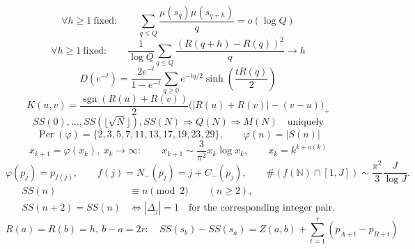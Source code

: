 \documentclass[11pt]{amsart}
\numberwithin{equation}{section}
\theoremstyle{plain}
\theoremstyle{definition}
\theoremstyle{remark}
\begin{document}
\begin{equation}
\label{eq:summary-sf-chowla}
\boxed{\;\forall h\ge1\ \text{fixed}:\qquad
\sum_{q\le Q}\frac{\mu(s_q)\mu(s_{q+h})}{q}=o(\log Q)\;}
\end{equation}
\begin{equation}
\label{eq:summary-window-variance}
\boxed{\;\forall h\ge1\ \text{fixed}:\qquad
\frac1{\log Q}\sum_{q\le Q}
\frac{(R(q+h)-R(q))^2}{q}\to h\;}
\end{equation}
\begin{equation}
\label{eq:summary-D-sinh}
\boxed{\;D(e^{-t})=
\frac{2e^{-t}}{1-e^{-t}}\sum_{q\ge0}e^{-tq/2}
\sinh\!\left(\frac{tR(q)}2\right)\;}
\end{equation}
\begin{equation}
\label{eq:summary-survival-kernel}
\boxed{\;K(u,v)=\frac{\operatorname{sgn}(R(u)+R(v))}{2}
\bigl(|R(u)+R(v)|-(v-u)\bigr)_+\;}
\end{equation}
\begin{equation}
\label{eq:summary-sqrt-recovery}
\boxed{\;SS(0),\ldots,SS(\lfloor\sqrt N\rfloor),SS(N)
\Longrightarrow Q(N)\Longrightarrow M(N)\quad\text{uniquely}\;}
\end{equation}
\begin{equation}
\label{eq:summary-phi-dynamics}
\boxed{\;\operatorname{Per}(\varphi)=\{2,3,5,7,11,13,17,19,23,29\},
\qquad \varphi(n)=|S(n)|\;}
\end{equation}
\begin{equation}
\label{eq:summary-phi-escape}
\boxed{\;x_{k+1}=\varphi(x_k),\ x_k\to\infty:
\qquad x_{k+1}\sim\frac{3}{\pi^2}x_k\log x_k,
\qquad x_k=k^{k+o(k)}\;}
\end{equation}
\begin{equation}
\label{eq:summary-prime-index-dynamics}
\boxed{\;\varphi(p_j)=p_{f(j)},\qquad
f(j)=N_-(p_j)=j+C_-(p_j),\qquad
\#(f(\mathbb N)\cap[1,J])\sim\frac{\pi^2}{3}\frac{J}{\log J}.\;}
\end{equation}
\begin{equation}
\label{eq:summary-parity-collision}
\boxed{\begin{aligned}
SS(n)&\equiv n\pmod2\qquad(n\ge2),\\
SS(n+2)=SS(n)&\iff |\Delta_j|=1
\quad\text{for the corresponding integer pair}.
\end{aligned}}
\end{equation}
\begin{equation}
\label{eq:summary-level-return}
\boxed{\;R(a)=R(b)=h,\ b-a=2r:\quad
SS(s_b)-SS(s_a)=Z(a,b)+\sum_{t=1}^{r}(p_{A+t}-p_{B+t})\;}
\end{equation}
\end{document}

